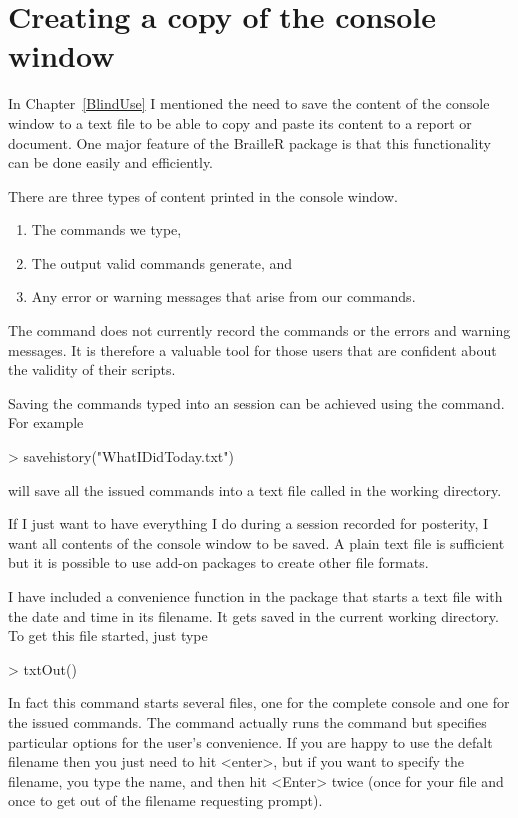 \section{Creating a copy of the \R{} console window}\label{CreateCopyConsole}

In Chapter~\ref{BlindUse} I mentioned the need to save the content of the console window to a text file to be able to copy and paste its content to a report or document. One major feature of the BrailleR package is that this functionality can be done easily and efficiently.

There are three types of content printed in the console window.\begin{enumerate}
\item The commands we type,
\item The output valid commands generate, and
\item Any error or warning messages that arise from our commands.
\end{enumerate}

The  command does not currently record the commands or the errors and warning messages. It is therefore a valuable tool for those \R{} users that are confident about the validity of their scripts.

Saving the commands typed into an \R{} session can be achieved using the  command. For example
\begin{Schunk}
\begin{Sinput}
> savehistory("WhatIDidToday.txt")
\end{Sinput}
\end{Schunk}
will save all the issued commands into a text file called  in the working directory. 

If I just want to have everything I do during a session recorded for posterity, I want all contents of the console window to be saved. A plain text file is sufficient but it is possible to use add-on packages to create other file formats.

I have included a convenience function in the  package that starts a text file with the date and time in its filename. It gets saved in the current working directory. To get this file started, just type
\begin{Schunk}
\begin{Sinput}
> txtOut()
\end{Sinput}
\end{Schunk}
In fact this command starts several files, one for the complete console and one for the issued commands. The command actually runs the  command but specifies particular options for the user's convenience. If you are happy to use the defalt filename then you just need to hit <enter>, but if you want to specify the filename, you type the name, and then hit <Enter> twice (once for your file and once to get out of the filename requesting prompt).

